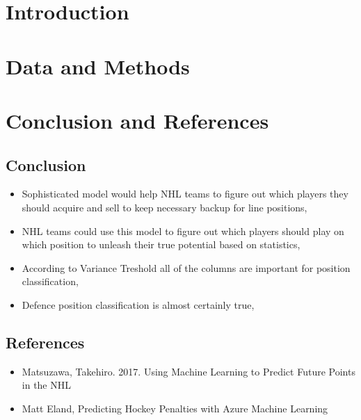 \documentclass{report}
\begin{document}
\chapter{Introduction}
    

\chapter{Data and Methods}
	
	
\chapter{Conclusion and References}
	\section{Conclusion}
		\begin{itemize}
			\item Sophisticated model would help NHL teams to figure out which players they should acquire and sell to keep necessary backup for line positions,
			\item NHL teams could use this model to figure out which players should play on which position to unleash their true potential based on statistics,
			\item According to Variance Treshold all of the columns are important for position classification,
			\item Defence position classification is almost certainly true,
		\end{itemize}
	\section{References}
		\begin{itemize}
			\item Matsuzawa, Takehiro. 2017. Using Machine Learning to Predict Future Points in the NHL
			\item Matt Eland, Predicting Hockey Penalties with Azure Machine Learning
		\end{itemize}
\end{document}
